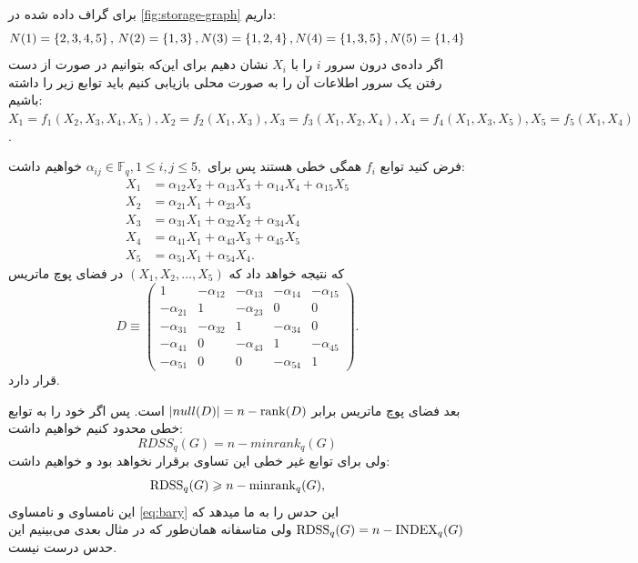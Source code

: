  \begin{example}
 	برای گراف داده شده در
 	\autoref{fig:storage-graph}
 	داریم:
 	$$
 		N(1) = \left\{ 2,3,4,5 \right\}, \, N(2)  = \left\{ 1,3 \right\}, N(3)  = \left\{ 1,2,4 \right\}, N(4)  = \left\{ 1,3,5 \right\},  N(5)  = \left\{ 1,4 \right\}
 	$$
 	اگر داده‌ی درون سرور
 	$i$
 	را با
 	$X_i$
 	نشان دهیم برای این‌که بتوانیم در صورت از دست رفتن یک سرور اطلاعات آن را به صورت محلی بازیابی کنیم باید توابع زیر را داشته باشیم: 	
 	$X_1 = f_1(X_2,X_3,X_4,X_5), X_2 = f_2(X_1,X_3), X_3 = f_3(X_1,X_2,X_4), X_4 = f_4(X_1,X_3, X_5), X_5 = f_5(X_1, X_4)$.

 	فرض کنید توابع
 	$f_i$
 	همگی خطی هستند پس برای
 	$\alpha_{ij} \in  \mathbb{F}_q, 1\le i,j\le 5,$
 	خواهیم داشت:
 	 	\begin{align*}
 		X_1 &= \alpha_{12} X_2 +\alpha_{13} X_3 + \alpha_{14}X_4 + \alpha_{15}X_5\\
 		X_2 &= \alpha_{21}X_1+\alpha_{23}X_3\\
 		X_3 &= \alpha_{31}X_1 +\alpha_{32}X_2+\alpha_{34}X_4\\
 		X_4 &= \alpha_{41}X_1 + \alpha_{43}X_3 + \alpha_{45}X_5\\
 		X_5 &= \alpha_{51}X_1+\alpha_{54}X_4.
 	\end{align*}
 	که نتیجه خواهد داد که
 	$(X_1,X_2,\dots, X_5)$
 	در فضای پوچ ماتریس
 	\[
 	D \equiv
 	\left( \begin{array}{ccccc}
 		1 & -\alpha_{12} & -\alpha_{13}  & - \alpha_{14} & -\alpha_{15} \\
 		-\alpha_{21} & 1 &  -\alpha_{23} & 0 & 0 \\
 		-\alpha_{31} & -\alpha_{32} & 1 & -\alpha_{34} & 0\\
 		-\alpha_{41} & 0 &-\alpha_{43}  & 1 & -\alpha_{45}\\
 		-\alpha_{51} &0 & 0 & -\alpha_{54} & 1
 	\end{array} \right).\] 
 	قرار دارد.
 	
 	بعد فضای پوچ ماتریس برابر
 	$\left|{null(D)}\right| = n - \operatorname{rank}(D)$
 	است. پس اگر خود را به توابع خطی محدود کنیم خواهیم داشت:
 	$$RDSS_q(G) = n - minrank_q(G)$$
 	ولی برای توابع غیر خطی این تساوی برقرار نخواهد بود و خواهیم داشت:
 	\begin{equation}
 		\mathrm{RDSS}_q(G) \geqslant n - \mathrm{minrank}_q(G),
 		\label{eq:minrk}
 	\end{equation}
 	این نامساوی و نامساوی
 	\autoref{eq:bary}
 	این حدس را به ما میدهد که
 	$\mathrm{RDSS}_q(G) = n - \mathrm{INDEX}_q(G)$
 	ولی متاسفانه همان‌طور که در مثال بعدی می‌بینیم این حدس درست نیست.
 \end{example}
 
